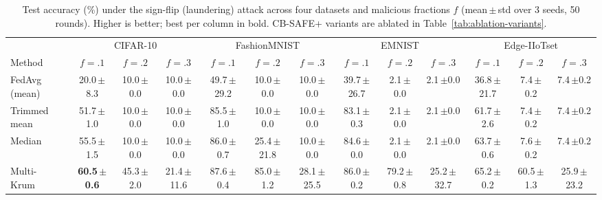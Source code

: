\begin{table}[t]\centering\footnotesize
\caption{Test accuracy (\%) under the sign-flip (laundering) attack across four datasets and malicious fractions $f$ (mean\,$\pm$\,std over 3 seeds, 50 rounds). Higher is better; best per column in bold. CB-SAFE+ variants are ablated in Table~\ref{tab:ablation-variants}.}
\label{tab:signflip}
\setlength{\tabcolsep}{1pt}
\begin{tabular}{@{}lcccccccccccc@{}}\toprule
& \multicolumn{3}{c}{CIFAR-10} & \multicolumn{3}{c}{FashionMNIST} & \multicolumn{3}{c}{EMNIST} & \multicolumn{3}{c}{Edge-IIoTset}\\
\cmidrule(lr){2-4}\cmidrule(lr){5-7}\cmidrule(lr){8-10}\cmidrule(l){11-13}
Method & $f{=}.1$ & $f{=}.2$ & $f{=}.3$ & $f{=}.1$ & $f{=}.2$ & $f{=}.3$ & $f{=}.1$ & $f{=}.2$ & $f{=}.3$ & $f{=}.1$ & $f{=}.2$ & $f{=}.3$\\\midrule
FedAvg (mean)~\cite{mcmahan2017} & 20.0\,{\scriptsize$\pm$8.3} & 10.0\,{\scriptsize$\pm$0.0} & 10.0\,{\scriptsize$\pm$0.0} & 49.7\,{\scriptsize$\pm$29.2} & 10.0\,{\scriptsize$\pm$0.0} & 10.0\,{\scriptsize$\pm$0.0} & 39.7\,{\scriptsize$\pm$26.7} & 2.1\,{\scriptsize$\pm$0.0} & 2.1\,{\scriptsize$\pm$0.0} & 36.8\,{\scriptsize$\pm$21.7} & 7.4\,{\scriptsize$\pm$0.2} & 7.4\,{\scriptsize$\pm$0.2}\\
Trimmed mean~\cite{yin2018} & 51.7\,{\scriptsize$\pm$1.0} & 10.0\,{\scriptsize$\pm$0.0} & 10.0\,{\scriptsize$\pm$0.0} & 85.5\,{\scriptsize$\pm$1.0} & 10.0\,{\scriptsize$\pm$0.0} & 10.0\,{\scriptsize$\pm$0.0} & 83.1\,{\scriptsize$\pm$0.3} & 2.1\,{\scriptsize$\pm$0.0} & 2.1\,{\scriptsize$\pm$0.0} & 61.7\,{\scriptsize$\pm$2.6} & 7.4\,{\scriptsize$\pm$0.2} & 7.4\,{\scriptsize$\pm$0.2}\\
Median~\cite{yin2018} & 55.5\,{\scriptsize$\pm$1.5} & 10.0\,{\scriptsize$\pm$0.0} & 10.0\,{\scriptsize$\pm$0.0} & 86.0\,{\scriptsize$\pm$0.7} & 25.4\,{\scriptsize$\pm$21.8} & 10.0\,{\scriptsize$\pm$0.0} & 84.6\,{\scriptsize$\pm$0.0} & 2.1\,{\scriptsize$\pm$0.0} & 2.1\,{\scriptsize$\pm$0.0} & 63.7\,{\scriptsize$\pm$0.6} & 7.6\,{\scriptsize$\pm$0.2} & 7.4\,{\scriptsize$\pm$0.2}\\
Multi-Krum~\cite{blanchard2017} & \textbf{60.5\,{\scriptsize$\pm$0.6}} & 45.3\,{\scriptsize$\pm$2.0} & 21.4\,{\scriptsize$\pm$11.6} & 87.6\,{\scriptsize$\pm$0.4} & 85.0\,{\scriptsize$\pm$1.2} & 28.1\,{\scriptsize$\pm$25.5} & 86.0\,{\scriptsize$\pm$0.2} & 79.2\,{\scriptsize$\pm$0.8} & 25.2\,{\scriptsize$\pm$32.7} & 65.2\,{\scriptsize$\pm$0.2} & 60.5\,{\scriptsize$\pm$1.3} & 25.9\,{\scriptsize$\pm$23.2}\\

\end{tabular}
\end{table}
